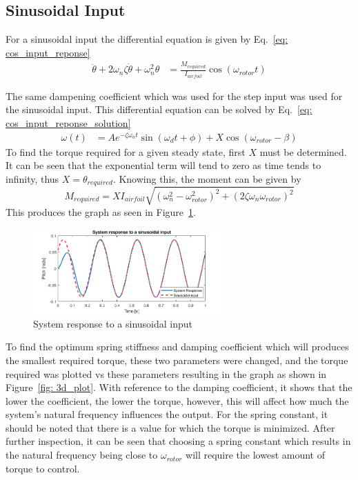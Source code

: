             \subsection{Sinusoidal Input}
                For a sinusoidal input the differential equation is given by Eq.~\ref*{eq: cos_input_reponse}
                \begin{align}
                    \ddot{\theta} +2\omega_{n}\zeta\dot{\theta} + \omega _{n}^2 \theta &= \frac{M_{required}}{I_{airfoil}}\cos(\omega_{rotor} t) \label{eq: cos_input_reponse}
                \end{align}

                The same dampening coefficient which was used for the step input was used for the sinusoidal input. This differential equation can be solved by Eq.~\ref{eq: cos_input_reponse_solution}
                \begin{align}
                    \omega(t) &= Ae^{-\zeta \omega_{n} t}\sin(\omega_d t + \phi) + X\cos (\omega_{rotor} - \beta) \label{eq: cos_input_reponse_solution}
                \end{align}
                \vspace*{-2mm}
                To find the torque required for a given steady state, first \(X\) must be determined. It can be seen that the exponential term will tend to zero as time tends to infinity, thus \(X = \theta_{required}\). Knowing this, the moment can be given by \[M_{required} = XI_{airfoil} \sqrt{\left(\omega_{n}^2 - \omega_{rotor}^2\right)^2 + \left(2 \zeta \omega_{n} \omega_{rotor}\right)^2}\] This produces the graph as seen in Figure~\ref{fig: cos_response}.
                \begin{figure}
                    \centering
                    \includegraphics*[width = 0.65\textwidth]{figs/Model/Pitch/System_response _for _sinusoidal_input.png}
                    \caption{System response to a sinusoidal input}
                    \label{fig: cos_response}
                \end{figure}
                To find the optimum spring stiffness and damping coefficient which will produces the smallest required torque, these two parameters were changed, and the torque required was plotted vs these parameters resulting in the graph as shown in Figure~\ref{fig: 3d_plot}. With reference to the damping coefficient, it shows that the lower the coefficient, the lower the torque, however, this will affect how much the system's natural frequency influences the output. For the spring constant, it should be noted that there is a value for which the torque is minimized. After further inspection, it can be seen that choosing a spring constant which results in the natural frequency being close to \(\omega_{rotor}\) will require the lowest amount of torque to control.
